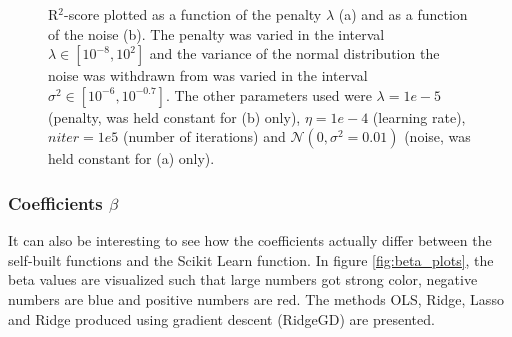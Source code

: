 \begin{figure} [H]%
	\centering
	\caption{R$^2$-score plotted as a function of the penalty $\lambda$ (a) and as a function of the noise (b). The penalty was varied in the interval $\lambda\in[10^{-8},10^2]$ and the variance of the normal distribution the noise was withdrawn from was varied in the interval $\sigma^2\in[10^{-6},10^{-0.7}]$. The other parameters used were $\lambda=1e-5$ (penalty, was held constant for (b) only), $\eta=1e-4$ (learning rate), $niter=1e5$ (number of iterations) and $\mathcal{N}(0, \sigma^2=0.01)$ (noise, was held constant for (a) only).}%
	\label{fig:R2_scores_terrain}
\end{figure}

\subsubsection{Coefficients $\beta$}
It can also be interesting to see how the coefficients actually differ between the self-built functions and the Scikit Learn function. In figure \eqref{fig:beta_plots}, the beta values are visualized such that large numbers got strong color, negative numbers are blue and positive numbers are red. The methods OLS, Ridge, Lasso and Ridge produced using gradient descent (RidgeGD) are presented. 


